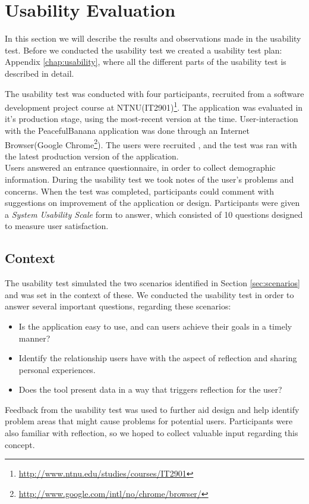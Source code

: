 \section{Usability Evaluation}
In this section we will describe the results and observations made in the usability test. Before we conducted the usability test we created a usability test plan: Appendix \ref{chap:usability}, where all the different parts of the usability test is described in detail.

The usability test was conducted with four participants, recruited from a software development project course at NTNU(IT2901)\footnote{\url{http://www.ntnu.edu/studies/courses/IT2901}}. The application was evaluated in it's production stage, using the most-recent version at the time. User-interaction with the PeacefulBanana application was done through an Internet Browser(Google Chrome\footnote{\url{http://www.google.com/intl/no/chrome/browser/}}). The users were recruited , and the test was ran with the latest production version of the application. \\
Users answered an entrance questionnaire, in order to collect demographic information. During the usability test we took notes of the user's problems and concerns. When the test was completed, participants could comment with suggestions on improvement of the application or design. Participants were given a \emph{System Usability Scale} form to answer\citep{brooke1996sus}, which consisted of 10 questions designed to measure user satisfaction. 

\subsection{Context}
\label{subsec:context}
The usability test simulated the two scenarios identified in Section \ref{sec:scenarios} and was set in the context of these. We conducted the usability test in order to answer several important questions, regarding these scenarios: 
\begin{itemize}
	\item Is the application easy to use, and can users achieve their goals in a timely manner?
	\item Identify the relationship users have with the aspect of reflection and sharing personal experiences.
	\item Does the tool present data in a way that triggers reflection for the user?
\end{itemize}
Feedback from the usability test was used to further aid design and help identify problem areas that might cause problems for potential users. Participants were also familiar with reflection, so we hoped to collect valuable input regarding this concept.

